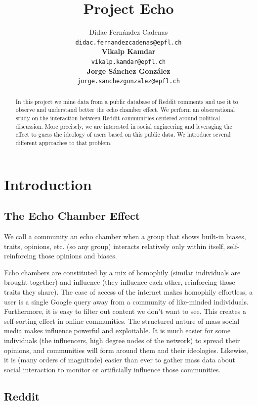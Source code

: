 \documentclass[11pt]{article}
\title{Project Echo}
\author{
Dídac Fernández Cadenas\\
{\tt didac.fernandezcadenas@epfl.ch} \\
\textbf{Vikalp Kamdar}\\
{\tt vikalp.kamdar@epfl.ch} \\
\textbf{Jorge Sánchez González}\\
{\tt jorge.sanchezgonzalez@epfl.ch} \\}
\date{}
\begin{document}
\maketitle
\begin{abstract}
 In this project we mine data from a public database of Reddit comments and use it to observe and understand better the echo chamber effect. We perform an observational study on the interaction between Reddit communities centered around political discussion. More precisely, we are interested in social engineering and leveraging the effect to guess the ideology of users based on this public data. We introduce several different approaches to that problem.
\end{abstract}

\section{Introduction}

\subsection{The Echo Chamber Effect}

We call a community an echo chamber when a group that shows built-in biases, traits, opinions, etc. (so any group) interacts relatively only within itself, self-reinforcing those opinions and biases.

Echo chambers are constituted by a mix of homophily (similar individuals are brought together) and influence (they influence each other, reinforcing those traits they share). The ease of access of the internet makes homophily effortless, a user is a single Google query away from a community of like-minded individuals. Furthermore, it is easy to filter out content we don't want to see. This creates a self-sorting effect in online communities. The structured nature of mass social media makes influence powerful and exploitable. It is much easier for some individuals (the influencers, high degree nodes of the network) to spread their opinions, and communities will form around them and their ideologies. Likewise, it is (many orders of magnitude) easier than ever to gather mass data about social interaction to monitor or artificially influence those communities.

\subsection{Reddit}
\end{document}
